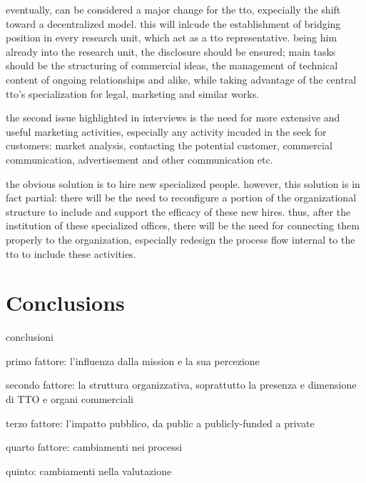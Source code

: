 eventually, can be considered a major change for the tto, expecially the shift toward a decentralized model. this will inlcude the establishment of bridging position in every research unit, which act as a tto representative. being him already into the research unit, the disclosure should be ensured; main tasks should be the structuring of commercial ideas, the management of technical content of ongoing relationships and alike, while taking advantage of the central tto's specialization for legal, marketing and similar works.

the second issue highlighted in interviews is the need for more extensive and useful marketing activities, especially any activity incuded in the seek for customers: market analysis, contacting the potential customer, commercial communication, advertisement and other communication etc. 

the obvious solution is to hire new specialized people. however, this solution is in fact partial: there will be the need to reconfigure a portion of the organizational structure to include and support the efficacy of these new hires. thus, after the institution of these specialized offices, there will be the need for connecting them properly to the organization, especially redesign the process flow internal to the tto to include these activities.

\section{Conclusions}


conclusioni

primo fattore: l'influenza dalla mission e la sua percezione

secondo fattore: la struttura organizzativa, soprattutto la presenza e dimensione di TTO e organi commerciali

terzo fattore: l'impatto pubblico, da public a publicly-funded a private

quarto fattore: cambiamenti nei processi

quinto: cambiamenti nella valutazione 